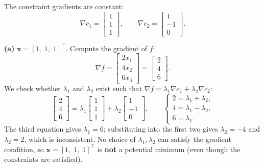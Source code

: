 \begin{solution}
    The constraint gradients are constant:
    \[
        \nabla c_1 =
        \begin{bmatrix} 1 \\ 1 \\ 1 \end{bmatrix},
        \qquad
        \nabla c_2 =
        \begin{bmatrix} 1 \\ -1 \\ 0 \end{bmatrix}.
    \]

    \textbf{(a)} $\mathbf{x} = [1,\; 1,\; 1]^\top$. Compute the gradient of $f$:
    \[
        \nabla f =
        \begin{bmatrix} 2x_1 \\ 4x_2 \\ 6x_3 \end{bmatrix}
        =
        \begin{bmatrix} 2 \\ 4 \\ 6 \end{bmatrix}.
    \]
    We check whether $\lambda_1$ and $\lambda_2$ exist such that $\nabla f = \lambda_1 \nabla c_1 + \lambda_2 \nabla c_2$:
    \[
        \begin{bmatrix} 2 \\ 4 \\ 6 \end{bmatrix}
        =
        \lambda_1 \begin{bmatrix} 1 \\ 1 \\ 1 \end{bmatrix}
        +
        \lambda_2 \begin{bmatrix} 1 \\ -1 \\ 0 \end{bmatrix},
        \qquad
        \begin{cases}
            2 = \lambda_1 + \lambda_2, \\
            4 = \lambda_1 - \lambda_2, \\
            6 = \lambda_1.
        \end{cases}
    \]
    The third equation gives $\lambda_1 = 6$; substituting into the first two gives $\lambda_2 = -4$ and $\lambda_2 = 2$, which is inconsistent. No choice of $\lambda_1, \lambda_2$ can satisfy the gradient condition, so $\mathbf{x} = [1,\; 1,\; 1]^\top$ is \textbf{not} a potential minimum (even though the constraints are satisfied).


\end{solution}
